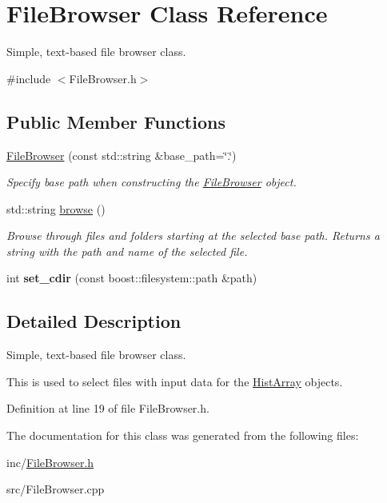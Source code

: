 \hypertarget{classFileBrowser}{}\section{File\+Browser Class Reference}
\label{classFileBrowser}


Simple, text-\/based file browser class.  




{\ttfamily \#include $<$File\+Browser.\+h$>$}

\subsection*{Public Member Functions}
\begin{DoxyCompactItemize}
\item 
\hypertarget{classFileBrowser_a6fbf64b13ec2e53f375e3e9ea3b1362a}{}\hyperlink{classFileBrowser_a6fbf64b13ec2e53f375e3e9ea3b1362a}{File\+Browser} (const std\+::string \&base\+\_\+path=\char`\"{}.\char`\"{})\label{classFileBrowser_a6fbf64b13ec2e53f375e3e9ea3b1362a}

\begin{DoxyCompactList}\small\item\em Specify base path when constructing the \hyperlink{classFileBrowser}{File\+Browser} object. \end{DoxyCompactList}\item 
\hypertarget{classFileBrowser_a188c69f0ffb1bc2510df206035fcbfd9}{}std\+::string \hyperlink{classFileBrowser_a188c69f0ffb1bc2510df206035fcbfd9}{browse} ()\label{classFileBrowser_a188c69f0ffb1bc2510df206035fcbfd9}

\begin{DoxyCompactList}\small\item\em Browse through files and folders starting at the selected base path. Returns a string with the path and name of the selected file. \end{DoxyCompactList}\item 
\hypertarget{classFileBrowser_ae65bbe179dd98f44439fc25a2e46a024}{}int {\bfseries set\+\_\+cdir} (const boost\+::filesystem\+::path \&path)\label{classFileBrowser_ae65bbe179dd98f44439fc25a2e46a024}

\end{DoxyCompactItemize}


\subsection{Detailed Description}
Simple, text-\/based file browser class. 

This is used to select files with input data for the \hyperlink{classHistArray}{Hist\+Array} objects. 

Definition at line 19 of file File\+Browser.\+h.



The documentation for this class was generated from the following files\+:\begin{DoxyCompactItemize}
\item 
inc/\hyperlink{FileBrowser_8h}{File\+Browser.\+h}\item 
src/File\+Browser.\+cpp\end{DoxyCompactItemize}
